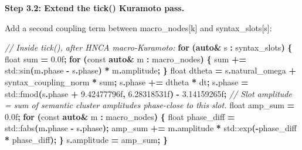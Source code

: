 \documentclass[
  11pt,
  a4paper,
]{article}
\newenvironment{Shaded}{\begin{snugshade}}{\end{snugshade}}
\newcommand{\AttributeTok}[1]{\textcolor[rgb]{0.13,0.29,0.53}{#1}}
\newcommand{\BuiltInTok}[1]{#1}
\newcommand{\CommentTok}[1]{\textcolor[rgb]{0.56,0.35,0.01}{\textit{#1}}}
\newcommand{\ControlFlowTok}[1]{\textcolor[rgb]{0.13,0.29,0.53}{\textbf{#1}}}
\newcommand{\DataTypeTok}[1]{\textcolor[rgb]{0.13,0.29,0.53}{#1}}
\newcommand{\FloatTok}[1]{\textcolor[rgb]{0.00,0.00,0.81}{#1}}
\newcommand{\KeywordTok}[1]{\textcolor[rgb]{0.13,0.29,0.53}{\textbf{#1}}}
\newcommand{\NormalTok}[1]{#1}
\newcommand{\OperatorTok}[1]{\textcolor[rgb]{0.81,0.36,0.00}{\textbf{#1}}}
\begin{document}
\textbf{Step 3.2: Extend the tick() Kuramoto pass.}

Add a second coupling term between macro\_nodes{[}k{]} and
syntax\_slots{[}s{]}:

\begin{Shaded}
\begin{Highlighting}[]
\CommentTok{// Inside tick(), after HNCA macro{-}Kuramoto:}
\ControlFlowTok{for} \OperatorTok{(}\KeywordTok{auto}\OperatorTok{\&}\NormalTok{ s }\OperatorTok{:}\NormalTok{ syntax\_slots}\OperatorTok{)} \OperatorTok{\{}
    \DataTypeTok{float}\NormalTok{ sum }\OperatorTok{=} \FloatTok{0.0}\BuiltInTok{f}\OperatorTok{;}
    \ControlFlowTok{for} \OperatorTok{(}\AttributeTok{const} \KeywordTok{auto}\OperatorTok{\&}\NormalTok{ m }\OperatorTok{:}\NormalTok{ macro\_nodes}\OperatorTok{)} \OperatorTok{\{}
\NormalTok{        sum }\OperatorTok{+=} \BuiltInTok{std::}\NormalTok{sin}\OperatorTok{(}\NormalTok{m}\OperatorTok{.}\NormalTok{phase }\OperatorTok{{-}}\NormalTok{ s}\OperatorTok{.}\NormalTok{phase}\OperatorTok{)} \OperatorTok{*}\NormalTok{ m}\OperatorTok{.}\NormalTok{amplitude}\OperatorTok{;}
    \OperatorTok{\}}
    \DataTypeTok{float}\NormalTok{ dtheta }\OperatorTok{=}\NormalTok{ s}\OperatorTok{.}\NormalTok{natural\_omega}
                 \OperatorTok{+}\NormalTok{ syntax\_coupling\_norm }\OperatorTok{*}\NormalTok{ sum}\OperatorTok{;}
\NormalTok{    s}\OperatorTok{.}\NormalTok{phase }\OperatorTok{+=}\NormalTok{ dtheta }\OperatorTok{*}\NormalTok{ dt}\OperatorTok{;}
\NormalTok{    s}\OperatorTok{.}\NormalTok{phase }\OperatorTok{=} \BuiltInTok{std::}\NormalTok{fmod}\OperatorTok{(}\NormalTok{s}\OperatorTok{.}\NormalTok{phase }\OperatorTok{+} \FloatTok{9.42477796}\BuiltInTok{f}\OperatorTok{,} \FloatTok{6.28318531}\BuiltInTok{f}\OperatorTok{)} \OperatorTok{{-}} \FloatTok{3.14159265}\BuiltInTok{f}\OperatorTok{;}
    \CommentTok{// Slot amplitude = sum of semantic cluster amplitudes phase{-}close to this slot.}
    \DataTypeTok{float}\NormalTok{ amp\_sum }\OperatorTok{=} \FloatTok{0.0}\BuiltInTok{f}\OperatorTok{;}
    \ControlFlowTok{for} \OperatorTok{(}\AttributeTok{const} \KeywordTok{auto}\OperatorTok{\&}\NormalTok{ m }\OperatorTok{:}\NormalTok{ macro\_nodes}\OperatorTok{)} \OperatorTok{\{}
        \DataTypeTok{float}\NormalTok{ phase\_diff }\OperatorTok{=} \BuiltInTok{std::}\NormalTok{fabs}\OperatorTok{(}\NormalTok{m}\OperatorTok{.}\NormalTok{phase }\OperatorTok{{-}}\NormalTok{ s}\OperatorTok{.}\NormalTok{phase}\OperatorTok{);}
\NormalTok{        amp\_sum }\OperatorTok{+=}\NormalTok{ m}\OperatorTok{.}\NormalTok{amplitude }\OperatorTok{*} \BuiltInTok{std::}\NormalTok{exp}\OperatorTok{({-}}\NormalTok{phase\_diff }\OperatorTok{*}\NormalTok{ phase\_diff}\OperatorTok{);}
    \OperatorTok{\}}
\NormalTok{    s}\OperatorTok{.}\NormalTok{amplitude }\OperatorTok{=}\NormalTok{ amp\_sum}\OperatorTok{;}
\OperatorTok{\}}
\end{Highlighting}
\end{Shaded}
\end{document}
